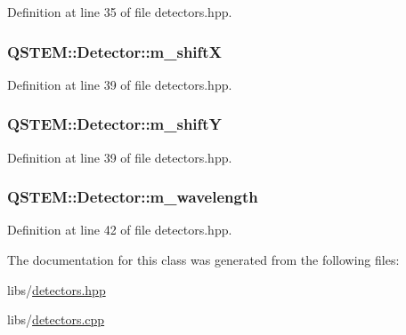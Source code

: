 Definition at line 35 of file detectors.\-hpp.

\hypertarget{class_q_s_t_e_m_1_1_detector_aabc60f1c30239eb91a7fa2abaff830f5}{
\subsubsection[{m\-\_\-shift\-X}]{ Q\-S\-T\-E\-M\-::\-Detector\-::m\-\_\-shift\-X}}\label{class_q_s_t_e_m_1_1_detector_aabc60f1c30239eb91a7fa2abaff830f5}


Definition at line 39 of file detectors.\-hpp.

\hypertarget{class_q_s_t_e_m_1_1_detector_aecef8dc2696bc564f61dda487df1faaa}{
\subsubsection[{m\-\_\-shift\-Y}]{ Q\-S\-T\-E\-M\-::\-Detector\-::m\-\_\-shift\-Y}}\label{class_q_s_t_e_m_1_1_detector_aecef8dc2696bc564f61dda487df1faaa}


Definition at line 39 of file detectors.\-hpp.

\hypertarget{class_q_s_t_e_m_1_1_detector_a43f01e8270594674ef03cd513e91d54b}{
\subsubsection[{m\-\_\-wavelength}]{ Q\-S\-T\-E\-M\-::\-Detector\-::m\-\_\-wavelength}}\label{class_q_s_t_e_m_1_1_detector_a43f01e8270594674ef03cd513e91d54b}


Definition at line 42 of file detectors.\-hpp.



The documentation for this class was generated from the following files\-:\begin{DoxyCompactItemize}
\item 
libs/\hyperlink{detectors_8hpp}{detectors.\-hpp}\item 
libs/\hyperlink{detectors_8cpp}{detectors.\-cpp}\end{DoxyCompactItemize}
